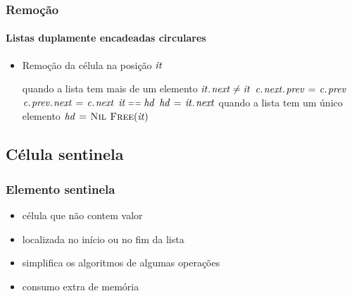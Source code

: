 \documentclass{beamer}
\begin{document}
\begin{frame}
  \frametitle{Remoção}
  \framesubtitle{Listas duplamente encadeadas circulares}

  \begin{itemize}
    \item Remoção da célula na posição $\id{it}$
      \begin{codebox}
        \zi \Comment quando a lista tem mais de um elemento
        \zi \If $\attrib{\id{it}}{next} \neq \id{it}$
        \zi \Then 
              $\attrib{\attrib{\id{c}}{next}}{prev} \gets \attrib{\id{c}}{prev}$
        \zi   $\attrib{\attrib{\id{c}}{prev}}{next} \gets \attrib{\id{c}}{next}$
        \zi   \If $\id{it} \isequal \id{hd}$
        \zi   \Then
                $\id{hd} \gets \attrib{\id{it}}{next}$
              \End
        \zi \Comment quando a lista tem um único elemento
        \zi \Else
              $\id{hd} \gets \const{Nil}$
            \End
        \zi \textcolor{gray}{$\proc{Free}(\id{it})$}
      \end{codebox}
  \end{itemize}
  
\end{frame}

\subsection{Célula sentinela}

\begin{frame}

  \frametitle{Elemento sentinela}

  \begin{itemize}
    \item célula que não contem valor
    \item localizada no início ou no fim da lista
    \item simplifica os algoritmos de algumas operações
    \item consumo extra de memória
  \end{itemize}

\end{frame}
\end{document}
